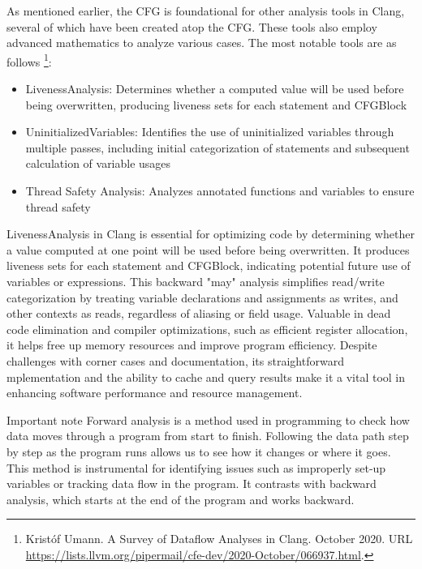 
As mentioned earlier, the CFG is foundational for other analysis tools in Clang, several of which have been created atop the CFG. These tools also employ advanced mathematics to analyze various cases. The most notable tools are as follows \footnote{Kristóf Umann. A Survey of Dataflow Analyses in Clang. October 2020. URL \url{https://lists.llvm.org/pipermail/cfe-dev/2020-October/066937.html}.}:

\begin{itemize}
\item
LivenessAnalysis: Determines whether a computed value will be used before being overwritten, producing liveness sets for each statement and CFGBlock

\item
UninitializedVariables: Identifies the use of uninitialized variables through multiple passes, including initial categorization of statements and subsequent calculation of variable usages

\item
Thread Safety Analysis: Analyzes annotated functions and variables to ensure thread safety
\end{itemize}

LivenessAnalysis in Clang is essential for optimizing code by determining whether a value computed at one point will be used before being overwritten. It produces liveness sets for each statement and CFGBlock, indicating potential future use of variables or expressions. This backward "may" analysis simplifies read/write categorization by treating variable declarations and assignments as writes, and other contexts as reads, regardless of aliasing or field usage. Valuable in dead code elimination and compiler optimizations, such as efficient register allocation, it helps free up memory resources and improve program efficiency. Despite challenges with corner cases and documentation, its straightforward mplementation and the ability to cache and query results make it a vital tool in enhancing software performance and resource management.

\begin{myNotic}{Important note}
Forward analysis is a method used in programming to check how data moves through a program from start to finish. Following the data path step by step as the program runs allows us to see how it changes or where it goes. This method is instrumental for identifying issues such as improperly set-up variables or tracking data flow in the program. It contrasts with backward analysis, which starts at the end of the program and works backward.
\end{myNotic}


